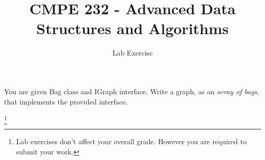\documentclass{article}
\newcommand\blfootnote[1]{%
  \begingroup
  \renewcommand\thefootnote{}\footnote{#1}%
  \addtocounter{footnote}{-1}%
  \endgroup
}
\begin{document}
\author{Lab Exercise}
\title{CMPE 232 - Advanced Data Structures and Algorithms}




\date{}
\maketitle
\setcounter{secnumdepth}{0}

You are given Bag class and IGraph interface. Write a graph, as an \textit{array of bags}, that implements the provided interface.


\blfootnote{Lab exercises don't affect your overall grade. However you are required to submit your work.}
\end{document}
